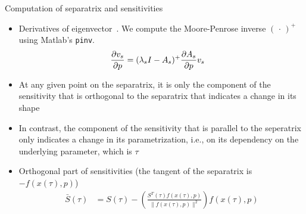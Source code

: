 \begin{frame}{Computation of separatrix and sensitivities}
	\begin{itemize}
		\item Derivatives of eigenvector~\cite{Petersen:Pedersen:2012, AbouMoustafa:2009}. We compute the Moore-Penrose inverse $(\,\cdot\,)^+$ using Matlab's \texttt{pinv}.
		\begin{align}
			\frac{\partial{v_s}}{\partial{p}} &= (\lambda_s I - A_s)^+ \frac{\partial{A_s}}{\partial{p}} v_s
		\end{align}
		\item At any given point on the separatrix, it is only the component of the sensitivity that is orthogonal to the separatrix that indicates a change in its shape
		\item In contrast, the component of the sensitivity that is parallel to the seperatrix only indicates a change in its parametrization, i.e., on its dependency on the underlying parameter, which is $\tau$
		\item Orthogonal part of sensitivities (the tangent of the separatrix is $-f(x(\tau), p)$)
		\begin{align}
			\bar S(\tau) &= S(\tau) - \left(\frac{S^T(\tau) f(x(\tau), p)}{\|f(x(\tau), p)\|^2}\right) f(x(\tau), p)
		\end{align}
	\end{itemize}
\end{frame}